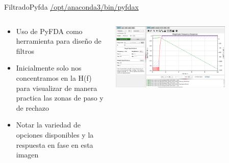 \begin{frame}[t]{Filtrado}{Pyfda \href{/opt/anaconda3/bin/pyfdax}{/opt/anaconda3/bin/pyfdax}}
   \begin{columns}[t]
      \footnotesize
      \begin{column}{.4\textwidth}
         \begin{itemize}
            \item{Uso de PyFDA como herramienta para diseño de filtros}
            \item{Inicialmente solo nos concentramos en la H(f) para visualizar de manera practica las zonas de paso y de rechazo}
            \item{Notar la variedad de opciones disponibles y la respuesta en fase en esta imagen}
         \end{itemize}
      \end{column}
      \hspace{2pt}
      \vrule
      \hspace{2pt}
      \begin{column}{.6\textwidth}
         \center\includegraphics[width=0.75\textwidth]{5_clase/pyfda2}
      \end{column}
      \hspace{2pt}
   \end{columns}
   \vfill
\end{frame}
